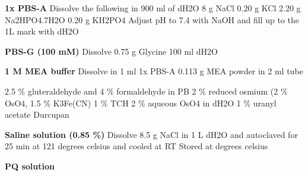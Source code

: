  \textbf{1x PBS-A}
Dissolve the following in 900 ml of dH2O 
8 g NaCl 
0.20 g KCl 
2.20 g Na2HPO4.7H2O
0.20 g KH2PO4 
Adjust pH to 7.4 with NaOH and fill up to the 1L mark with dH2O

\textbf{PBS-G (100 mM)}
Dissolve
0.75 g Glycine 
100 ml dH2O

\textbf{1 M MEA buffer}
Dissolve in 1 ml 1x PBS-A
0.113 g MEA powder in 2 ml tube

2.5 \% gluteraldehyde and 4 \% formaldehyde in PB
2 \% reduced osmium (2 \% OsO4, 1.5 \% K3Fe(CN)
1 \% TCH
2 \% aqueous OsO4 in dH2O
1 \% uranyl acetate
Durcupan

\textbf{Saline solution (0.85 \%)}
Dissolve 8.5 g NaCl in 1 L dH2O and autoclaved for 25 min at 121 degrees celsius and cooled at RT
Stored at degrees celsius 

\textbf {PQ solution} 


